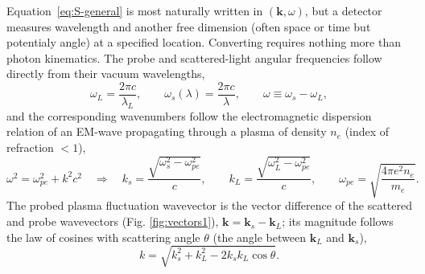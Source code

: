 \documentclass[11pt]{article}
\begin{document}
Equation~\ref{eq:S-general} is most naturally written in $(\mathbf k,\omega)$, but a
detector measures wavelength and another free dimension (often space or time but potentialy angle) at a specified location. Converting requires nothing more than photon kinematics. The probe and scattered-light angular frequencies
follow directly from their vacuum wavelengths,
\begin{equation}
  \omega_L = \frac{2\pi c}{\lambda_L}, \qquad
  \omega_s(\lambda) = \frac{2\pi c}{\lambda}, \qquad
  \omega \equiv \omega_s-\omega_L,
\end{equation}
and the corresponding wavenumbers follow the electromagnetic dispersion relation of an EM-wave propagating through a plasma of density $n_e$ (index of refraction $<1$),
\begin{equation}
  \omega^2 = \omega_{pe}^2+k^2c^2 \quad\Longrightarrow\quad
  k_s = \frac{\sqrt{\omega_s^2-\omega_{pe}^2}}{c}, \qquad
  k_L = \frac{\sqrt{\omega_L^2-\omega_{pe}^2}}{c}, \qquad
  \omega_{pe} = \sqrt{\frac{4\pi e^2n_e}{m_e}}.
\end{equation}
The probed plasma fluctuation wavevector is the vector difference of the scattered and probe
wavevectors (Fig. \ref{fig:vectors1}), $\mathbf k = \mathbf k_s-\mathbf k_L$; its
magnitude follows the law of cosines with scattering angle $\theta$ (the angle between
$\mathbf k_L$ and $\mathbf k_s$),
\begin{equation}\label{eq:law-of-cosines}
  k = \sqrt{k_s^2+k_L^2-2k_sk_L\cos\theta}.
\end{equation}
\end{document}
